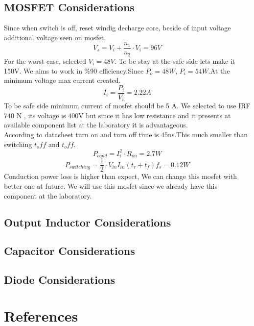 \documentclass{article}
\begin{document}
\subsection{MOSFET Considerations}
Since when switch is off, reset windig decharge core, beside of input voltage additional voltage seen on mosfet.
\begin{equation}
    V_s=V_i+\frac{n_1}{n_2}\cdot V_i=96 V
\end{equation}
For the worst case, selected $V_i=48V$. To be stay at the safe side lets make it 150V.
We aims to work in \%90 efficiency.Since $P_o=48 W$, $P_i=54 W$.At the minimum voltage max current created.
\begin{equation}
    I_i=\frac{P_i}{V_i}=2.22 A
\end{equation}
To be safe side minimum current of mosfet should be 5 A.
We selected to use IRF 740 N \cite{mosfet}, its voltage is 400V but since it has low resistance and it presents at available component list at the laboratory it is advantageous.
\\According to datasheet turn on and turn off time is 45ns.This much smaller than switching $t_off$ and $t_off$.
\begin{equation}
    P_{cond}=I_{i}^2\cdot R_{on}=2.7 W
\end{equation}
\begin{equation}
    P_{switching}=\frac{1}{2}\cdot V_{in}I_{in}(t_r+t_f)f_s=0.12W
\end{equation}
Conduction power loss is higher than expect, We can change this mosfet with better one at future. We will use this mosfet since we already have this component at the laboratory.
\subsection{Output Inductor Considerations}
\subsection{Capacitor Considerations}
\subsection{Diode Considerations}
\section{References}
\printbibliography
\end{document}

